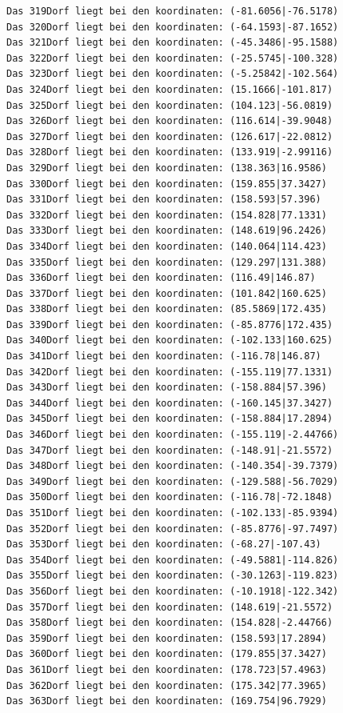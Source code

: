 \documentclass{article}
\begin{document}
\begin{verbatim}
Das 319Dorf liegt bei den koordinaten: (-81.6056|-76.5178)
Das 320Dorf liegt bei den koordinaten: (-64.1593|-87.1652)
Das 321Dorf liegt bei den koordinaten: (-45.3486|-95.1588)
Das 322Dorf liegt bei den koordinaten: (-25.5745|-100.328)
Das 323Dorf liegt bei den koordinaten: (-5.25842|-102.564)
Das 324Dorf liegt bei den koordinaten: (15.1666|-101.817)
Das 325Dorf liegt bei den koordinaten: (104.123|-56.0819)
Das 326Dorf liegt bei den koordinaten: (116.614|-39.9048)
Das 327Dorf liegt bei den koordinaten: (126.617|-22.0812)
Das 328Dorf liegt bei den koordinaten: (133.919|-2.99116)
Das 329Dorf liegt bei den koordinaten: (138.363|16.9586)
Das 330Dorf liegt bei den koordinaten: (159.855|37.3427)
Das 331Dorf liegt bei den koordinaten: (158.593|57.396)
Das 332Dorf liegt bei den koordinaten: (154.828|77.1331)
Das 333Dorf liegt bei den koordinaten: (148.619|96.2426)
Das 334Dorf liegt bei den koordinaten: (140.064|114.423)
Das 335Dorf liegt bei den koordinaten: (129.297|131.388)
Das 336Dorf liegt bei den koordinaten: (116.49|146.87)
Das 337Dorf liegt bei den koordinaten: (101.842|160.625)
Das 338Dorf liegt bei den koordinaten: (85.5869|172.435)
Das 339Dorf liegt bei den koordinaten: (-85.8776|172.435)
Das 340Dorf liegt bei den koordinaten: (-102.133|160.625)
Das 341Dorf liegt bei den koordinaten: (-116.78|146.87)
Das 342Dorf liegt bei den koordinaten: (-155.119|77.1331)
Das 343Dorf liegt bei den koordinaten: (-158.884|57.396)
Das 344Dorf liegt bei den koordinaten: (-160.145|37.3427)
Das 345Dorf liegt bei den koordinaten: (-158.884|17.2894)
Das 346Dorf liegt bei den koordinaten: (-155.119|-2.44766)
Das 347Dorf liegt bei den koordinaten: (-148.91|-21.5572)
Das 348Dorf liegt bei den koordinaten: (-140.354|-39.7379)
Das 349Dorf liegt bei den koordinaten: (-129.588|-56.7029)
Das 350Dorf liegt bei den koordinaten: (-116.78|-72.1848)
Das 351Dorf liegt bei den koordinaten: (-102.133|-85.9394)
Das 352Dorf liegt bei den koordinaten: (-85.8776|-97.7497)
Das 353Dorf liegt bei den koordinaten: (-68.27|-107.43)
Das 354Dorf liegt bei den koordinaten: (-49.5881|-114.826)
Das 355Dorf liegt bei den koordinaten: (-30.1263|-119.823)
Das 356Dorf liegt bei den koordinaten: (-10.1918|-122.342)
Das 357Dorf liegt bei den koordinaten: (148.619|-21.5572)
Das 358Dorf liegt bei den koordinaten: (154.828|-2.44766)
Das 359Dorf liegt bei den koordinaten: (158.593|17.2894)
Das 360Dorf liegt bei den koordinaten: (179.855|37.3427)
Das 361Dorf liegt bei den koordinaten: (178.723|57.4963)
Das 362Dorf liegt bei den koordinaten: (175.342|77.3965)
Das 363Dorf liegt bei den koordinaten: (169.754|96.7929)

\end{verbatim}
\end{document}
